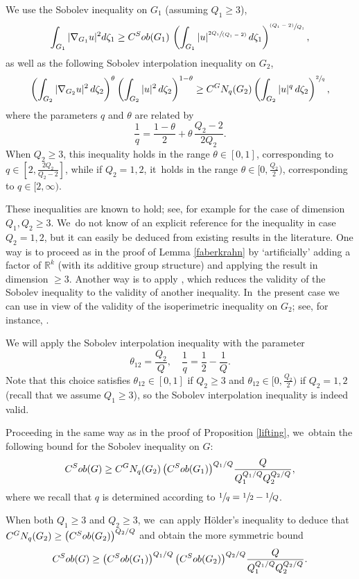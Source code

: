 \documentclass[11pt]{article}
\let\oldsfrac\sfrac
\renewcommand{\sfrac}[2]{{\oldsfrac{#1}{#2}}}
\newcommand{\psfrac}[2]{{\sfrac{(#1)}{#2}}}
\newcommand{\spfrac}[2]{{\sfrac{#1}{(#2)}}}
\newcommand{\GN}{\textup{GN}}
\newcommand{\Sob}{\textup{Sob}}
\theoremstyle{definition}
\newcommand{\1}{\mathbbm{1}}
\newcommand{\R}{\mathbb{R}}
\numberwithin{equation}{section}
\begin{document}
We use the Sobolev inequality on $G_1$ (assuming $Q_1 \geq 3$),
\[
\int_{G_1} |\nabla_{G_1} u|^2 d\zeta_1 \geq C^\Sob(G_1) \,\left(\int_{G_1} |u|^\spfrac{2Q_1}{Q_1 - 2}\,d\zeta_1\right)^\psfrac{Q_1-2}{Q_1},
\]
as well as the following Sobolev interpolation inequality on $G_2$,
\[
\left(\int_{G_2} |\nabla_{G_2} u|^2\,d\zeta_2\right)^{\theta} \left(\int_{G_2} | u|^2\,d \zeta_2\right)^{1-\theta}
\geq C^\GN_q(G_2) \left(\int_{G_2} |u|^{q} \,d\zeta_2\right)^\sfrac2 {q},
\]
where the parameters $q$ and $\theta$ are related by
\[
\frac 1 q = \frac {1-\theta}{2} + \theta \,\frac{Q_2-2}{2Q_2}.
\]
When $Q_2\geq 3$, this inequality holds in the range $\theta\in[0,1]$, corresponding to $q\in [2,\frac{2Q_2}{Q_2-2}]$, while if $Q_2=1,2$, it~holds in the range $\theta\in[0,\frac{Q_2}2)$, corresponding to $q\in[2,\infty)$.

These inequalities are known to hold; see, for example \cite{Fo, Va} for the case of dimension $Q_1,Q_2\geq 3$. We~do not know of an explicit reference for the inequality in case $Q_2=1,2$, but it can easily be deduced from existing results in the literature. One way is to proceed as in the proof of Lemma \ref{faberkrahn} by `artificially' adding a factor of $\R^k$ (with its additive group structure) and applying the result in dimension $\geq 3$. Another way is to apply \cite[Cor.\,3.6]{BaCoLeSC}, which reduces the validity of the Sobolev inequality to the validity of another inequality. In~the present case we can use \cite[Th.\,8.1]{BaCoLeSC} in view of the validity of the isoperimetric inequality on $G_2$; see, for instance, \cite[Prop.\,1.17 and the following remarks]{HaKo}.

We will apply the Sobolev interpolation inequality with the parameter
\[
\theta_{12} = \frac{Q_2}Q,\quad \frac 1q = \frac 12 - \frac{1}{Q}.
\]
Note that this choice satisfies $\theta_{12}\in[0,1]$ if $Q_2\geq 3$ and $\theta_{12}\in[0,\frac{Q_2}{2})$ if $Q_2=1,2$ (recall that we assume $Q_1\geq 3$), so the Sobolev interpolation inequality is indeed valid.

Proceeding in the same way as in the proof of Proposition \ref{lifting}, we~obtain the following bound for the Sobolev inequality on $G$:
\begin{equation}\label{eq:asym}
C^\Sob(G)\geq C^\GN_q(G_2)\,\bigl(C^\Sob (G_1)\bigr)^{Q_1/Q} \frac{Q} {Q_1^{Q_1/Q} Q_2^{Q_2/Q}},
\end{equation}
where we recall that $q$ is determined according to $\sfrac 1q = \sfrac 12 - \sfrac{1}{Q}$.

When both $Q_1\geq 3$ and $Q_2 \geq 3$, we~can apply Hölder's inequality to deduce that $C^\GN_q(G_2)\geq \bigl(C^\Sob(G_2)\bigr)^{Q_2/Q}$ and obtain the more symmetric bound
\begin{equation}\label{eq:sym}
C^\Sob(G)\geq \bigl(C^\Sob(G_1)\bigr)^{Q_1/Q}\,\bigl(C^\Sob(G_2)\bigr)^{Q_2/Q} \frac{Q} {Q_1^{Q_1/Q} Q_2^{Q_2/Q}}.
\end{equation}
\end{document}
